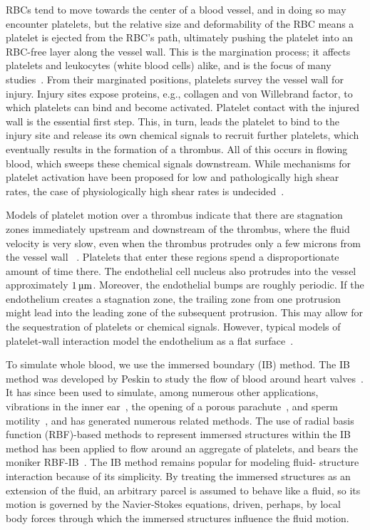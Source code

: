 RBCs tend to move towards the center of a blood vessel, and in doing so may encounter
platelets, but the relative size and deformability of the RBC means a platelet is ejected
from the RBC's path, ultimately pushing the platelet into an RBC-free layer along the
vessel wall. This is the margination process; it affects platelets and leukocytes (white
blood cells) alike, and is the focus of many studies~\cite{Freund:2007kx,Erickson:2010ep,
Erickson:2011cf,Zhao:2011do,Kumar:2011dd,Zhao:2012ggba,Fedosov:2012dy,Kumar:2012ie,
Fedosov:2013ul,Muller:2014is,Fedosov:2014bs, Vahidkhah:2014hy,Vahidkhah:2015ch,
Mehrabadi:2016fn}. From their marginated positions, platelets survey the vessel wall for
injury. Injury sites expose proteins, e.g., collagen and von Willebrand factor, to which
platelets can bind and become activated. Platelet contact with the injured wall is the
essential first step. This, in turn, leads the platelet to bind to the injury site and
release its own chemical signals to recruit further platelets, which eventually results
in the formation of a thrombus. All of this occurs in flowing blood, which sweeps these
chemical signals downstream. While mechanisms for platelet activation have been proposed
for low and pathologically high shear rates, the case of physiologically high shear rates
is undecided~\cite{Fogelson:2015fb}.

Models of platelet motion over a thrombus indicate that there are stagnation zones
immediately upstream and downstream of the thrombus, where the fluid velocity is very
slow, even when the thrombus protrudes only a few microns from the vessel wall~%
\cite{Skorczewski:2013jn,Wang:2013gs}. Platelets that enter these regions spend a
disproportionate amount of time there. The endothelial cell nucleus also protrudes into
the vessel approximately $1\um$. Moreover, the endothelial bumps are roughly periodic. If
the endothelium creates a stagnation zone, the trailing zone from one protrusion might
lead into the leading zone of the subsequent protrusion. This may allow for the
sequestration of platelets or chemical signals. However, typical models of platelet-wall
interaction model the endothelium as a flat surface~\cite{Wu:2014gt,Vahidkhah:2015ch}.

To simulate whole blood, we use the immersed boundary (IB) method. The IB method was
developed by Peskin to study the flow of blood around heart valves~\cite{Peskin:1972wa}.
It has since been used to simulate, among numerous other applications, vibrations in the
inner ear~\cite{BeyerJr:1990tb}, the opening of a porous parachute~\cite{Kim:2006ku}, and
sperm motility~\cite{Dillon:2011cu}, and has generated numerous related methods. The use
of radial basis function (RBF)-based methods to represent immersed structures within the
IB method has been applied to flow around an aggregate of platelets, and bears the
moniker RBF-IB~\cite{Shankar:2015km}. The IB method remains popular for modeling fluid-%
structure interaction because of its simplicity. By treating the immersed structures as
an extension of the fluid, an arbitrary parcel is assumed to behave like a fluid, so its
motion is governed by the Navier-Stokes equations, driven, perhaps, by local body forces
through which the immersed structures influence the fluid motion.


